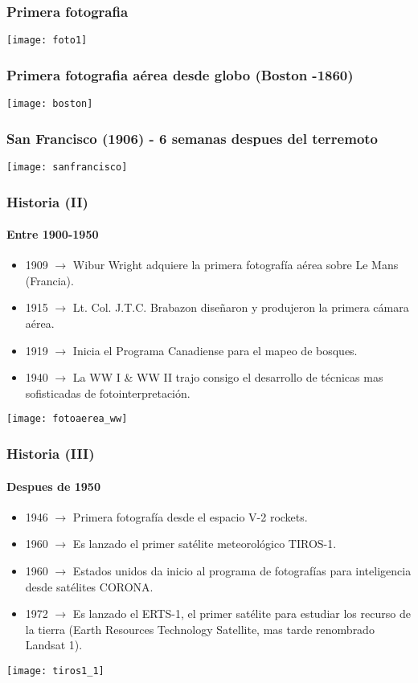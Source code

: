 \documentclass[]{beamer}
\begin{document}
\begin{frame}
\frametitle{Primera fotografia}
\begin{center}
\texttt{[image: foto1]}
\end{center}
\end{frame}
\begin{frame}
\frametitle{Primera fotografia aérea desde globo (Boston -1860)}
\begin{center}
\texttt{[image: boston]}
\end{center}
\end{frame}
\begin{frame}
\frametitle{San Francisco (1906) - 6 semanas despues del terremoto}
\begin{center}
\texttt{[image: sanfrancisco]}
\end{center}
\end{frame}
\begin{frame}
\frametitle{Historia (II)}
\framesubtitle{Entre 1900-1950}
\small{
\begin{itemize}
\item 1909 $\rightarrow$ Wibur Wright adquiere la primera fotografía aérea sobre Le Mans (Francia).
\item 1915 $\rightarrow$ Lt. Col. J.T.C. Brabazon diseñaron y produjeron la primera cámara aérea.
\item 1919 $\rightarrow$ Inicia el Programa Canadiense para el mapeo de bosques. 
\item 1940 $\rightarrow$ La WW I \& WW II trajo consigo el desarrollo de técnicas mas sofisticadas de fotointerpretación.
\end{itemize}
}
\begin{center}
\texttt{[image: fotoaerea\_ww]}
\end{center}
\end{frame}
\begin{frame}
\frametitle{Historia (III)}
\framesubtitle{Despues de 1950}
\small{
\begin{itemize}
\item 1946 $\rightarrow$ Primera fotografía desde el espacio V-2 rockets.
\item 1960 $\rightarrow$ Es lanzado el primer satélite meteorológico TIROS-1.
\item 1960 $\rightarrow$ Estados unidos da inicio al programa de fotografías para inteligencia desde satélites CORONA.
\item 1972 $\rightarrow$ Es lanzado el ERTS-1, el primer satélite para estudiar los recurso de la tierra (Earth Resources Technology Satellite, mas tarde renombrado Landsat 1).  
\end{itemize}
}
\begin{center}
\texttt{[image: tiros1\_1]}
\end{center}
\end{frame}
\end{document}
